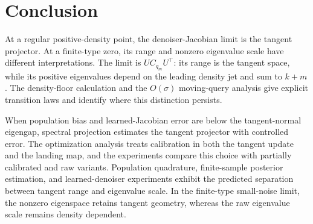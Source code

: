 \documentclass[10pt]{article}
\theoremstyle{c2fup}
\begin{document}
\section{Conclusion}

At a regular positive-density point, the denoiser-Jacobian limit is the tangent projector.  At a finite-type zero, its range and nonzero eigenvalue scale have different interpretations.  The limit is $UC_{q_m}U^\top$: its range is the tangent space, while its positive eigenvalues depend on the leading density jet and sum to $k+m$.  The density-floor calculation and the $O(\sigma)$ moving-query analysis give explicit transition laws and identify where this distinction persists.

When population bias and learned-Jacobian error are below the tangent-normal eigengap, spectral projection estimates the tangent projector with controlled error.  The optimization analysis treats calibration in both the tangent update and the landing map, and the experiments compare this choice with partially calibrated and raw variants.  Population quadrature, finite-sample posterior estimation, and learned-denoiser experiments exhibit the predicted separation between tangent range and eigenvalue scale.  In the finite-type small-noise limit, the nonzero eigenspace retains tangent geometry, whereas the raw eigenvalue scale remains density dependent.




\appendix

\end{document}
